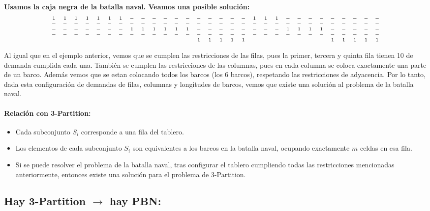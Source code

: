 \textbf{Usamos la caja negra de la batalla naval. Veamos una posible solución:}
\[
\scriptsize
\begin{array}{cccccccccccccccccccccccccccccc}
1 & 1 & 1 & 1 & 1 & 1 & 1 & - & - & - & - & - & - & - & - & - & - & - & 1 & 1 & 1 & - & - & - & - & - & - & - & - & - \\
- & - & - & - & - & - & - & - & - & - & - & - & - & - & - & - & - & - & - & - & - & - & - & - & - & - & - & - & - & - \\
- & - & - & - & - & - & - & 1 & 1 & 1 & 1 & 1 & 1 & - & - & - & - & - & - & - & - & 1 & 1 & 1 & 1 & - & - & - & - & - \\
- & - & - & - & - & - & - & - & - & - & - & - & - & - & - & - & - & - & - & - & - & - & - & - & - & - & - & - & - & - \\
- & - & - & - & - & - & - & - & - & - & - & - & - & 1 & 1 & 1 & 1 & 1 & - & - & - & - & - & - & - & 1 & 1 & 1 & 1 & 1 \\
\end{array}
\]

Al igual que en el ejemplo anterior, vemos que se cumplen las restricciones de las filas, pues la primer, tercera y quinta fila tienen 10 de demanda cumplida cada una.
También se cumplen las restricciones de las columnas, pues en cada columna se coloca exactamente una parte de un barco.
Además vemos que se estan colocando todos los barcos (los 6 barcos), respetando las restricciones de adyacencia.
Por lo tanto, dada esta configuración de demandas de filas, columnas y longitudes de barcos, vemos que existe una solución al problema de la batalla naval.

\paragraph{Relación con 3-Partition:}
\begin{itemize}
    \item Cada subconjunto \(S_i\) corresponde a una fila del tablero. 
    \item Los elementos de cada subconjunto \(S_i\) son equivalentes a los barcos en la batalla naval, ocupando exactamente \(m\) celdas en esa fila.
    \item Si se puede resolver el problema de la batalla naval, tras configurar el tablero cumpliendo todas las restricciones mencionadas anteriormente, entonces existe una solución para el problema de \(3\)-Partition.
\end{itemize}

\subsection{Hay 3-Partition $\rightarrow$ hay PBN:}

